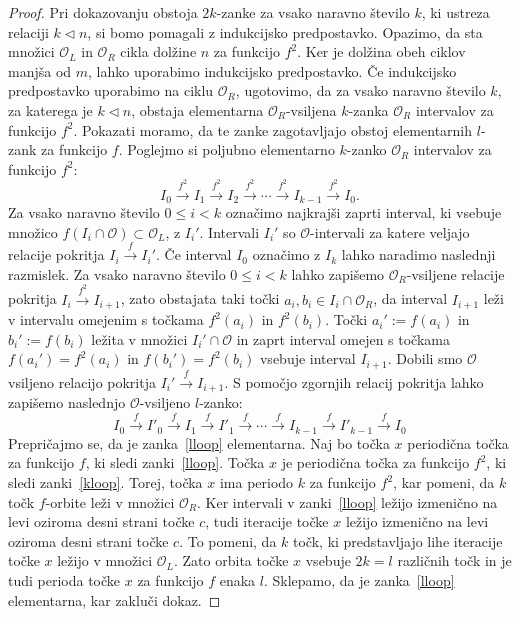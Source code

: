 \documentclass[mat2]{fmfdelo}
\begin{document}
\begin{proof}
Pri dokazovanju obstoja $2k$-zanke za vsako naravno število $k$, ki ustreza relaciji $k \triangleleft n$, si bomo pomagali z indukcijsko predpostavko. Opazimo, da sta množici $\mathcal{O}_L$ in $\mathcal{O}_R$  cikla dolžine $n$ za funkcijo $f^2$. Ker je dolžina obeh ciklov manjša od $m$, lahko uporabimo indukcijsko predpostavko. Če indukcijsko predpostavko uporabimo na ciklu $\mathcal{O}_R$, ugotovimo, da za vsako naravno število $k$, za katerega je $k \triangleleft n$, obstaja elementarna $\mathcal{O}_R$-vsiljena $k$-zanka $\mathcal{O}_R$ intervalov za funkcijo $f^2$. Pokazati moramo, da te zanke zagotavljajo obstoj elementarnih $l$-zank za funkcijo $f$. Poglejmo si poljubno elementarno $k$-zanko $\mathcal{O}_R$ intervalov za funkcijo $f^2$:
\begin{equation}\label{kloop}
I_0 \xrightarrow{f^2} I_1 \xrightarrow{f^2} I_2 \xrightarrow{f^2} \cdots \xrightarrow{f^2} I_{k-1} \xrightarrow{f^2} I_0.
\end{equation}
Za vsako naravno število $0 \leq i < k$ označimo najkrajši zaprti interval, ki vsebuje množico $f(I_i \cap \mathcal{O}) \subset \mathcal{O}_L$, z $I_i'$. Intervali $I_i'$ so $\mathcal{O}$-intervali za katere veljajo relacije pokritja $I_i \xrightarrow{f} I_i'$. Če interval $I_0$ označimo z $I_k$ lahko naradimo naslednji razmislek. Za vsako naravno število $0 \leq i < k$ lahko zapišemo $\mathcal{O}_R$-vsiljene relacije pokritja $I_i \xrightarrow{f^2} I_{i+1}$, zato obstajata taki točki $a_i, b_i \in I_i \cap \mathcal{O}_R$, da interval $I_{i+1}$ leži v intervalu omejenim s točkama $f^2(a_i)$ in $f^2(b_i)$. Točki $a_i' := f(a_i)$ in $b_i' := f(b_i)$ ležita v množici $I_i' \cap \mathcal{O}$ in zaprt interval omejen s točkama $f(a_i') = f^2(a_i)$ in $f(b_i') = f^2(b_i)$ vsebuje interval $I_{i+1}$. Dobili smo $\mathcal{O}$ vsiljeno relacijo pokritja $I_i' \xrightarrow{f} I_{i+1}$. S pomočjo zgornjih relacij pokritja lahko zapišemo naslednjo $\mathcal{O}$-vsiljeno $l$-zanko:
\begin{equation}\label{lloop}
I_0 \xrightarrow{f} I'_0 \xrightarrow{f} I_1 \xrightarrow{f} I'_1 \xrightarrow{f} \cdots \xrightarrow{f} I_{k-1} \xrightarrow{f} I'_{k-1} \xrightarrow{f} I_0
\end{equation}
Prepričajmo se, da je zanka~\eqref{lloop} elementarna. Naj bo točka $x$ periodična točka za funkcijo $f$, ki sledi zanki~\eqref{lloop}. Točka $x$ je periodična točka za funkcijo $f^2$, ki sledi zanki~\eqref{kloop}. Torej, točka $x$ ima periodo $k$ za funkcijo $f^2$, kar pomeni, da $k$ točk $f$-orbite leži v množici $\mathcal{O}_R$. Ker intervali v zanki~\eqref{lloop} ležijo izmenično na levi oziroma desni strani točke $c$, tudi iteracije točke $x$ ležijo izmenično na levi oziroma desni strani točke $c$. To pomeni, da $k$ točk, ki predstavljajo lihe iteracije točke $x$ ležijo v množici $\mathcal{O}_L$. Zato orbita točke $x$ vsebuje $2k = l$ različnih točk in je tudi perioda točke $x$ za funkcijo $f$ enaka $l$. Sklepamo, da je zanka~\eqref{lloop} elementarna, kar zakluči dokaz.
\end{proof}
\end{document}
